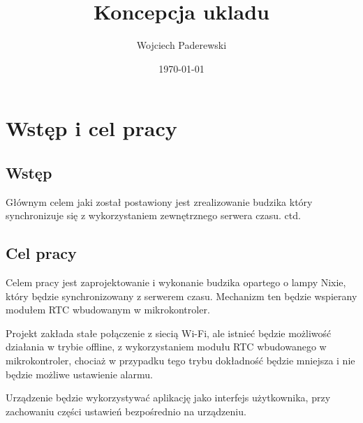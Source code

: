 \documentclass[../main.tex]{subfiles}
\author{Wojciech Paderewski}
\date{\today}
\title{Koncepcja ukladu}
\begin{document}
\section{Wstęp i cel pracy}
\subsection{Wstęp}
Głównym celem jaki został postawiony jest zrealizowanie budzika który synchronizuje się z wykorzystaniem zewnętrznego serwera czasu. ctd.
\subsection{Cel pracy}
Celem pracy jest zaprojektowanie i wykonanie budzika opartego o lampy Nixie, który będzie synchronizowany z serwerem czasu. 
Mechanizm ten będzie wspierany modułem RTC wbudowanym w mikrokontroler.

Projekt zakłada stałe połączenie z siecią Wi-Fi, ale istnieć będzie możliwość
działania w trybie offline, z wykorzystaniem modułu RTC wbudowanego w mikrokontroler, 
chociaż w przypadku tego trybu dokładność będzie mniejsza i nie będzie możliwe ustawienie alarmu. 

Urządzenie będzie wykorzystywać aplikację jako interfejs użytkownika, przy zachowaniu części ustawień bezpośrednio
na urządzeniu.
\end{document}
